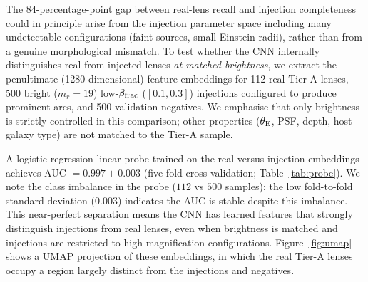 \documentclass[fleqn,usenatbib]{rasti}
\begin{document}
The 84-percentage-point gap between real-lens recall and injection completeness could in principle arise from the injection parameter space including many undetectable configurations (faint sources, small Einstein radii), rather than from a genuine morphological mismatch.  To test whether the CNN internally distinguishes real from injected lenses \emph{at matched brightness}, we extract the penultimate (1280-dimensional) feature embeddings for 112 real Tier-A lenses, 500 bright ($m_r = 19$) low-$\beta_{\rm frac}$ ($[0.1, 0.3]$) injections configured to produce prominent arcs, and 500 validation negatives.  We emphasise that only brightness is strictly controlled in this comparison; other properties ($\theta_{\rm E}$, PSF, depth, host galaxy type) are not matched to the Tier-A sample.

A logistic regression linear probe trained on the real versus injection embeddings achieves AUC $= 0.997 \pm 0.003$ (five-fold cross-validation; Table~\ref{tab:probe}).  We note the class imbalance in the probe ($112$ vs $500$ samples); the low fold-to-fold standard deviation ($0.003$) indicates the AUC is stable despite this imbalance.  This near-perfect separation means the CNN has learned features that strongly distinguish injections from real lenses, even when brightness is matched and injections are restricted to high-magnification configurations.  Figure~\ref{fig:umap} shows a UMAP projection of these embeddings, in which the real Tier-A lenses occupy a region largely distinct from the injections and negatives.
\end{document}
